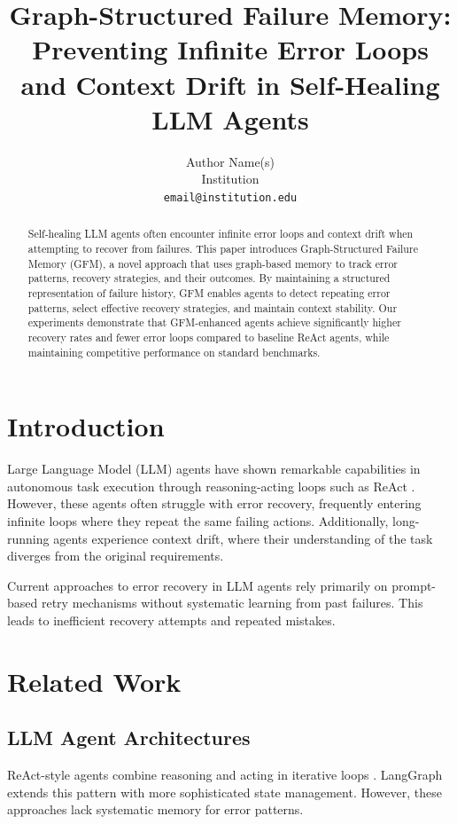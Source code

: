 \documentclass{conference}
\title{Graph-Structured Failure Memory: Preventing Infinite Error Loops and Context Drift in Self-Healing LLM Agents}
\author{
    Author Name(s)\\
    Institution\\
    \texttt{email@institution.edu}
}
\begin{document}
\maketitle

\begin{abstract}
Self-healing LLM agents often encounter infinite error loops and context drift when attempting to recover from failures. This paper introduces Graph-Structured Failure Memory (GFM), a novel approach that uses graph-based memory to track error patterns, recovery strategies, and their outcomes. By maintaining a structured representation of failure history, GFM enables agents to detect repeating error patterns, select effective recovery strategies, and maintain context stability. Our experiments demonstrate that GFM-enhanced agents achieve significantly higher recovery rates and fewer error loops compared to baseline ReAct agents, while maintaining competitive performance on standard benchmarks.
\end{abstract}

\section{Introduction}
Large Language Model (LLM) agents have shown remarkable capabilities in autonomous task execution through reasoning-acting loops such as ReAct \cite{react}. However, these agents often struggle with error recovery, frequently entering infinite loops where they repeat the same failing actions. Additionally, long-running agents experience context drift, where their understanding of the task diverges from the original requirements.

Current approaches to error recovery in LLM agents rely primarily on prompt-based retry mechanisms without systematic learning from past failures. This leads to inefficient recovery attempts and repeated mistakes.

\section{Related Work}
\subsection{LLM Agent Architectures}
ReAct-style agents combine reasoning and acting in iterative loops \cite{react}. LangGraph extends this pattern with more sophisticated state management. However, these approaches lack systematic memory for error patterns.
\end{document}

